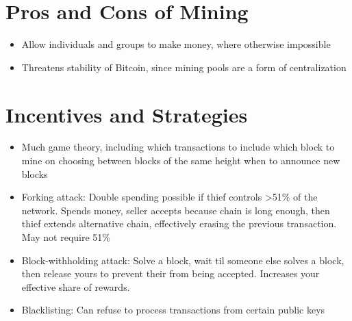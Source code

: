 \documentclass{article}
\begin{document}
\section{Pros and Cons of Mining}
\begin{itemize}
\item Allow individuals and groups to make money, where otherwise impossible
\item Threatens stability of Bitcoin, since mining pools are a form of centralization
\end{itemize}

\section{Incentives and Strategies}
\begin{itemize}
\item Much game theory, including
\subitem which transactions to include
\subitem which block to mine on
\subitem choosing between blocks of the same height
\subitem when to announce new blocks
\item Forking attack: Double spending possible if thief controls >51\% of the network. Spends money, seller accepts because chain is long enough, then thief extends alternative chain, effectively erasing the previous transaction. May not require 51\%
\item Block-withholding attack: Solve a block, wait til someone else solves a block, then release yours to prevent their from being accepted. Increases your effective share of rewards.
\item Blacklisting: Can refuse to process transactions from certain public keys
\end{itemize}
\end{document}
